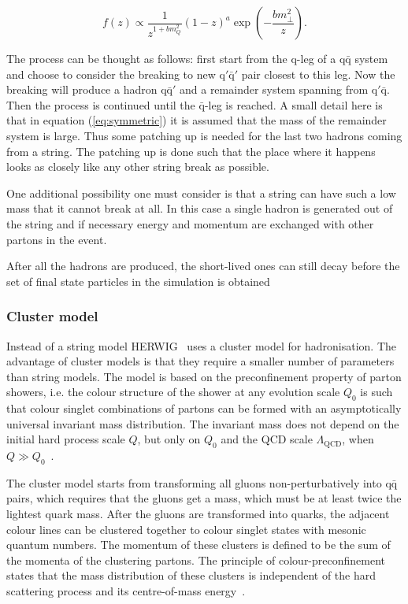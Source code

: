 \begin{equation}
f\left(z\right) \propto \frac{1}{z^{1+bm_Q^2}} \left(1-z\right)^a \exp \left(-\frac{b m_\perp ^2}{z} \right).
\label{eq:symmetric2}
\end{equation}

\noindent The process can be thought as follows: first start from the q-leg of a $\mathrm{q \bar{q}}$ system and choose to consider the breaking to new $\mathrm{q' \bar q'}$ pair closest to this leg. Now the breaking will produce a hadron $\mathrm{q \bar{q}'}$ and a remainder system spanning from $\mathrm{q' \bar{q}}$. Then the process is continued until the $\bar{\mathrm{q}}$-leg is reached. A small detail here is that in equation (\ref{eq:symmetric}) it is assumed that the mass of the remainder system is large. Thus some patching up is needed for the last two hadrons coming from a string. The patching up is done such that the place where it happens looks as closely like any other string break as possible.


One additional possibility one must consider is that a string can have such a low mass that it cannot break at all. In this case a single hadron is generated out of the string and if necessary  energy and momentum are exchanged with other partons in the event.

After all the hadrons are produced, the short-lived ones can still decay before the set of final state particles in the simulation is obtained~\cite{missing}


\subsubsection*{Cluster model}
Instead of a string model HERWIG~\cite{herwigManual} uses a cluster model for hadronisation. The advantage of cluster models is that they require a smaller number of parameters than string models. The model is based on the preconfinement property of parton showers, i.e. the colour structure of the shower at any evolution scale $Q_0$ is such that colour singlet combinations of partons can be formed with an asymptotically universal invariant mass distribution. The invariant mass does not depend on the initial hard process scale $Q$, but only on $Q_0$ and the QCD scale $\Lambda _ \mathrm{QCD}$, when $Q \gg Q_0$~\cite{missing}.

The cluster model starts from transforming all gluons non-perturbatively into $\mathrm{q \bar q}$ pairs, which requires that the gluons get a mass, which must be at least twice the lightest quark mass. After the gluons are transformed into quarks, the adjacent colour lines can be clustered together to colour singlet states with mesonic quantum numbers. The momentum of these clusters is defined to be the sum of the momenta of the clustering partons. The principle of colour-preconfinement states that the mass distribution of these clusters is independent of the hard scattering process and its centre-of-mass energy~\cite{herwigManual}. %

